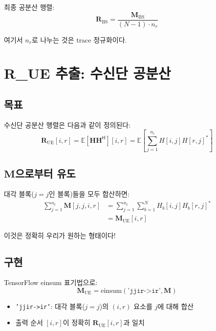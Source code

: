 \documentclass[10pt]{article}
\begin{document}
최종 공분산 행렬:
\begin{equation}
\mathbf{R}_{\text{BS}} = \frac{\mathbf{M}_{\text{BS}}}{(N-1) \cdot n_r}
\end{equation}

여기서 $n_r$로 나누는 것은 trace 정규화이다.

\section{R\_UE 추출: 수신단 공분산}

\subsection{목표}

수신단 공분산 행렬은 다음과 같이 정의된다:
\begin{equation}
\mathbf{R}_{\text{UE}}[i,r] = \mathbb{E}\left[\mathbf{H} \mathbf{H}^{\mathsf{H}}\right][i,r] = \mathbb{E}\left[\sum_{j=1}^{n_t} H[i,j] H[r,j]^*\right]
\end{equation}

\subsection{$\mathbf{M}$으로부터 유도}

대각 블록($j=j$인 블록)들을 모두 합산하면:
\begin{align}
\sum_{j=1}^{n_t} \mathbf{M}[j,j,i,r] &= \sum_{j=1}^{n_t} \sum_{b=1}^{N} H_b[i,j] H_b[r,j]^* \\
&= \mathbf{M}_{\text{UE}}[i,r]
\end{align}

이것은 정확히 우리가 원하는 형태이다!

\subsection{구현}

TensorFlow einsum 표기법으로:
\begin{equation}
\boxed{\mathbf{M}_{\text{UE}} = \text{einsum}(\texttt{'jjir->ir'}, \mathbf{M})}
\end{equation}

\begin{itemize}
    \item \texttt{'jjir->ir'}: 대각 블록($j=j$)의 $(i,r)$ 요소를 $j$에 대해 합산
    \item 출력 순서 $[i,r]$이 정확히 $\mathbf{R}_{\text{UE}}[i,r]$과 일치
\end{itemize}
\end{document}
